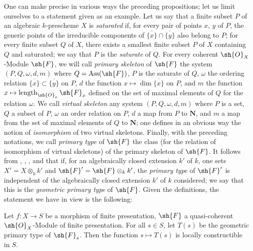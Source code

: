 \begin{remark}[9.8.9]
\label{IV.9.8.9}
One can make precise in various ways the preceding propositions; let us limit ourselves to a statement given as an example.
Let us say that a finite subset $P$ of an algebraic $k$-prescheme $X$ is \emph{saturated} if, for every pair of points $x$, $y$ of $P$, the generic points of the irreducible components of $\overline{\{x\}}\cap\overline{\{y\}}$ also belong to $P$; for every finite subset $Q$ of $X$, there exists a smallest finite subset $P$ of $X$ containing $Q$ and saturated; we say that $P$ is the \emph{saturate} of $Q$.
For every coherent $\sh{O}_X$-Module $\sh{F}$, we will call \emph{primary skeleton} of $\sh{F}$ the system $(P,Q,\omega,d,m)$ where $Q=\operatorname{Ass}(\sh{F})$, $P$ is the saturate of $Q$, $\omega$ the ordering relation $\overline{\{x\}}\subset\overline{\{y\}}$ on $P$, $d$ the function $x\mapsto\dim\overline{\{x\}}$ on $P$, and $m$ the function $x\mapsto\operatorname{length}_{\sh{O}_x}\sh{F}_x$ defined on the set of maximal elements of $Q$ for the relation $\omega$.
We call \emph{virtual skeleton} any system $(P,Q,\omega,d,m)$ where $P$ is a set, $Q$ a subset of $P$, $\omega$ an order relation on $P$, $d$ a map from $P$ to $\mathbf{N}$, and $m$ a map from the set of maximal elements of $Q$ to $\mathbf{N}$; one defines in an obvious way the notion of \emph{isomorphism} of two virtual skeletons.
Finally, with the preceding notations, we call \emph{primary type} of $\sh{F}$ the class (for the relation of isomorphism of virtual skeletons) of the primary skeleton of $\sh{F}$.
It follows from , , ,  and  that if, for an algebraically closed extension $k'$ of $k$, one sets $X'=X\otimes_k k'$ and $\sh{F}'=\sh{F}\otimes_k k'$, the \emph{primary type} of $\sh{F}'$ is independent of
the algebraically closed extension $k'$ of $k$ considered; we say that this is the \emph{geometric primary type} of $\sh{F}$.
Given the definitions, the statement we have in view is the following:

\medskip
\noindent
\emph{}
\label{IV.9.8.9.1}
Let $f:X\to S$ be a morphism of finite presentation, $\sh{F}$ a quasi-coherent $\sh{O}_X$-Module of finite presentation.
For all $s\in S$, let $T(s)$ be the geometric primary type of $\sh{F}_s$.
Then the function $s\mapsto T(s)$ is locally constructible in $S$.


\end{remark}
